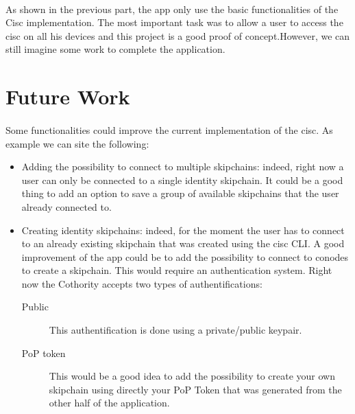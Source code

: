 \paragraph{}
As shown in the previous part, the app only use the basic functionalities of the Cisc implementation. The most important task was to allow a user to access the cisc on all his devices and this project is a good proof of concept.However, we can still imagine some work to complete the application.

\section{Future Work}

\paragraph{}
Some functionalities could improve the current implementation of the cisc. As example we can site the following:
\begin{itemize}
  \item Adding the possibility to connect to multiple skipchains: indeed, right now a user can only be connected to a single identity skipchain. It could be a good thing to add an option to save a group of available skipchains that the user already connected to.
  \item Creating identity skipchains: indeed, for the moment the user has to connect to an already existing skipchain that was created using the cisc CLI. A good improvement of the app could be to add the possibility to connect to conodes to create a skipchain. This would require an authentication system. Right now the Cothority accepts two types of authentifications:
  \begin{description}
    \item[Public] This authentification is done using a private/public keypair.
    \item[PoP token] This would be a good idea to add the possibility to create your own skipchain using directly your PoP Token that was generated from the other half of the application.
  \end{description}
\end{itemize}
